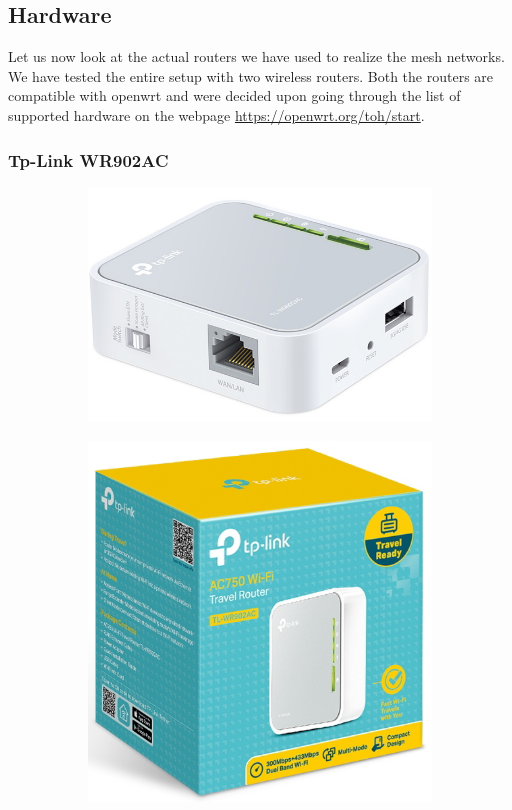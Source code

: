 \subsection{Hardware}
Let us now look at the actual routers we have used to realize the mesh networks. We have tested the entire setup with two wireless routers. Both the routers are compatible with openwrt and were decided upon going through the list of supported hardware on the webpage \url{https://openwrt.org/toh/start}.

\subsubsection{Tp-Link WR902AC}

\begin{figure}[h]
	\centering
	\begin{subfigure}{0.5\textwidth}
		\centering
		\includegraphics[scale=0.3]{Pictures/tplink12.png}
	\end{subfigure}%
	\begin{subfigure}{0.5\textwidth}
		\centering
		\includegraphics[scale=0.3]{Pictures/tplink2.png}

\end{subfigure}
\end{figure}
